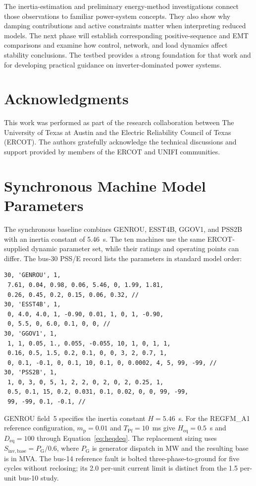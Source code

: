 \documentclass[11pt]{article}
\begin{document}
The inertia-estimation and preliminary energy-method investigations connect those observations to familiar power-system concepts. They also show why damping contributions and active constraints matter when interpreting reduced models. The next phase will establish corresponding positive-sequence and EMT comparisons and examine how control, network, and load dynamics affect stability conclusions. The testbed provides a strong foundation for that work and for developing practical guidance on inverter-dominated power systems.

\section*{Acknowledgments}
This work was performed as part of the research collaboration between The University of Texas at Austin and the Electric Reliability Council of Texas (ERCOT). The authors gratefully acknowledge the technical discussions and support provided by members of the ERCOT and UNIFI communities.

\appendix
\section{Synchronous Machine Model Parameters}
\label{app:params}
The synchronous baseline combines GENROU, ESST4B, GGOV1, and PSS2B with an inertia constant of 5.46~s. The ten machines use the same ERCOT-supplied dynamic parameter set, while their ratings and operating points can differ. The bus-30 PSS/E record lists the parameters in standard model order:

\begin{lstlisting}[language={}]
30, 'GENROU', 1,
 7.61, 0.04, 0.98, 0.06, 5.46, 0, 1.99, 1.81,
 0.26, 0.45, 0.2, 0.15, 0.06, 0.32, //
30, 'ESST4B', 1,
 0, 4.0, 4.0, 1, -0.90, 0.01, 1, 0, 1, -0.90,
 0, 5.5, 0, 6.0, 0.1, 0, 0, //
30, 'GGOV1', 1,
 1, 1, 0.05, 1., 0.055, -0.055, 10, 1, 0, 1, 1,
 0.16, 0.5, 1.5, 0.2, 0.1, 0, 0, 3, 2, 0.7, 1,
 0, 0.1, -0.1, 0, 0.1, 10, 0.1, 0, 0.0002, 4, 5, 99, -99, //
30, 'PSS2B', 1,
 1, 0, 3, 0, 5, 1, 2, 2, 0, 2, 0, 2, 0.25, 1,
 0.5, 0.1, 15, 0.2, 0.031, 0.1, 0.02, 0, 0, 99, -99,
 99, -99, 0.1, -0.1, //
\end{lstlisting}

GENROU field~5 specifies the inertia constant $H=5.46$~s. For the REGFM\_A1 reference configuration, $m_{\mathrm{p}}=0.01$ and $T_{\mathrm{Pf}}=10$~ms give $H_{\mathrm{eq}}=0.5$~s and $D_{\mathrm{eq}}=100$ through Equation~\eqref{eq:heqdeq}. The replacement sizing uses $S_{\mathrm{inv,base}}=P_{\mathrm{G}}/0.6$, where $P_{\mathrm{G}}$ is generator dispatch in MW and the resulting base is in MVA. The bus-14 reference fault is bolted three-phase-to-ground for five cycles without reclosing; its 2.0 per-unit current limit is distinct from the 1.5 per-unit bus-10 study.
\end{document}
